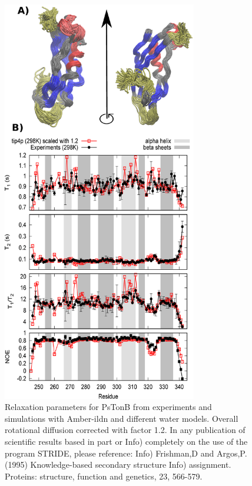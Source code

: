 \documentclass[pre,aps,floatfix,authordate1-4,twocolumn]{revtex4-1}
\begin{document}
\begin{figure}[!h]
  \includegraphics[width=8.5cm]{../Figs/RELdataPsTonB2.eps}%
  \caption{Relaxation parameters for PsTonB from
    experiments and simulations with Amber-ildn and different water models.
    Overall rotational diffusion corrected with factor 1.2.    
    In any publication of scientific results based in part or
    Info) completely on the use of the program STRIDE, please reference:
    Info)  Frishman,D and Argos,P. (1995) Knowledge-based secondary structure
    Info)  assignment. Proteins: structure, function and genetics, 23, 566-579.
    \label{PsTonBrelaxationDATAscaled}}%
\end{figure}
\end{document}
